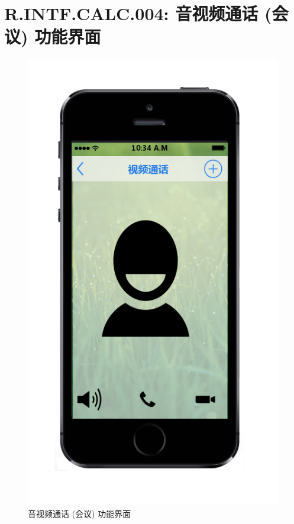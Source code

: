     \section{R.INTF.CALC.004: 音视频通话 (会议) 功能界面}
    \begin{figure}[h]
        \centering
        \includegraphics[scale=0.6]{OutlineDesign/figures/音视频通话 (会议) 功能界面.png}
        \caption{音视频通话 (会议) 功能界面}
        \label{fig:server_flow}
    \end{figure}
    \newpage
